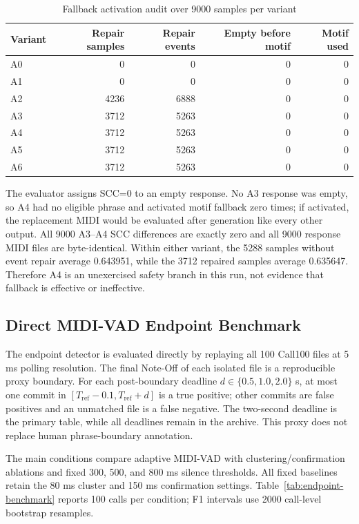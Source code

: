 \documentclass[11pt,a4paper]{article}
\begin{document}
\begin{table}[htbp]
\centering
\caption{Fallback activation audit over 9000 samples per variant}
\label{tab:fallback-audit}
\small
\begin{tabular}{lrrrr}
\toprule
Variant & Repair samples & Repair events & Empty before motif & Motif used \\
\midrule
A0 & 0 & 0 & 0 & 0 \\
A1 & 0 & 0 & 0 & 0 \\
A2 & 4236 & 6888 & 0 & 0 \\
A3 & 3712 & 5263 & 0 & 0 \\
A4 & 3712 & 5263 & 0 & 0 \\
A5 & 3712 & 5263 & 0 & 0 \\
A6 & 3712 & 5263 & 0 & 0 \\
\bottomrule
\end{tabular}
\end{table}

The evaluator assigns SCC=0 to an empty response. No A3 response was empty, so A4 had no eligible phrase and activated motif fallback zero times; if activated, the replacement MIDI would be evaluated after generation like every other output. All 9000 A3--A4 SCC differences are exactly zero and all 9000 response MIDI files are byte-identical. Within either variant, the 5288 samples without event repair average 0.643951, while the 3712 repaired samples average 0.635647. Therefore A4 is an unexercised safety branch in this run, not evidence that fallback is effective or ineffective.

\subsection{Direct MIDI-VAD Endpoint Benchmark}
\label{subsec:endpoint-benchmark}

The endpoint detector is evaluated directly by replaying all 100 Call100 files at 5 ms polling resolution. The final Note-Off of each isolated file is a reproducible proxy boundary. For each post-boundary deadline $d\in\{0.5,1.0,2.0\}$ s, at most one commit in $[T_{\mathrm{ref}}-0.1,T_{\mathrm{ref}}+d]$ is a true positive; other commits are false positives and an unmatched file is a false negative. The two-second deadline is the primary table, while all deadlines remain in the archive. This proxy does not replace human phrase-boundary annotation.

The main conditions compare adaptive MIDI-VAD with clustering/confirmation ablations and fixed 300, 500, and 800 ms silence thresholds. All fixed baselines retain the 80 ms cluster and 150 ms confirmation settings. Table~\ref{tab:endpoint-benchmark} reports 100 calls per condition; F1 intervals use 2000 call-level bootstrap resamples.
\end{document}
